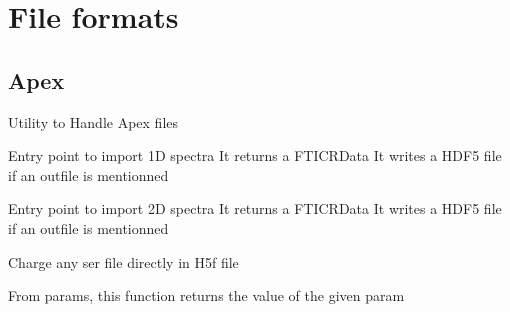 \documentclass[letterpaper,10pt,openany,oneside]{sphinxmanual}
\begin{document}
\section{File formats}
\label{rst/code:file-formats}

\subsection{Apex}
\label{rst/code:apex}\label{rst/code:module-File.Apex}
Utility to Handle Apex files

\begin{fulllineitems}
\label{rst/code:File.Apex.Import_1D}
Entry point to import 1D spectra
It returns a FTICRData
It writes a HDF5 file if an outfile is mentionned

\end{fulllineitems}


\begin{fulllineitems}
\label{rst/code:File.Apex.Import_2D}
Entry point to import 2D spectra
It returns a FTICRData
It writes a HDF5 file if an outfile is mentionned

\end{fulllineitems}


\begin{fulllineitems}
\label{rst/code:File.Apex.Ser2D_to_H5f}
Charge any ser file directly in H5f file

\end{fulllineitems}


\begin{fulllineitems}
\label{rst/code:File.Apex.get_param}
From params, this function returns the  value of the given param

\end{fulllineitems}
\end{document}
